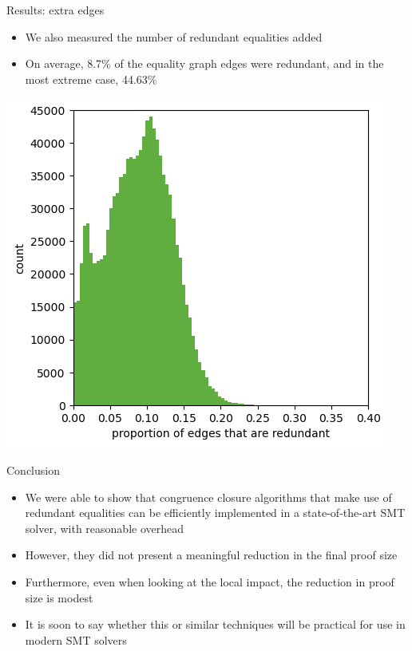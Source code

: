 \documentclass[aspectratio=169]{beamer}
\newcommand\vitem{\vfill\item}
\newcommand\pvitem{\pause\vfill\item}
\begin{document}
\begin{frame}{Results: extra edges}
  \begin{minipage}[c][0.5 \textheight]{0.46 \textwidth}
  \begin{itemize}
    \item We also measured the number of redundant equalities added
    \vitem On average, 8.7\% of the equality graph edges were redundant, and in
    the most extreme case, 44.63\%
  \end{itemize}
  \end{minipage}
  \hfill
  \begin{minipage}{0.52 \textwidth}
  \centerline{\includegraphics[width=\textwidth]{images/extra-hist.png}}
  \end{minipage}
\end{frame}

\begin{frame}{Conclusion}
  \begin{itemize}
    \item We were able to show that congruence closure algorithms that make use
    of redundant equalities can be efficiently implemented in a state-of-the-art
    SMT solver, with reasonable overhead
    \vitem However, they did not present a meaningful reduction in the final
    proof size
    \vitem Furthermore, even when looking at the local impact, the reduction in
    proof size is modest
    \pvitem It is soon to say whether this or similar techniques will be
    practical for use in modern SMT solvers
  \end{itemize}
\end{frame}

\begin{frame}
  \printbibliography
\end{frame}
\end{document}
